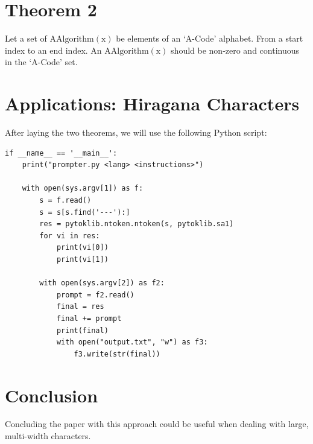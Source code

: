 \documentclass[10pt, twocolumn]{article}
\theoremstyle{plain}
\theoremstyle{definition}
\theoremstyle{remark}
\begin{document}
\section{Theorem 2}
\label{sec:acode-theorem02}

Let a set of $\operatorname{AAlgorithm(x)}$ be elements of an `A-Code' alphabet. From a start index to an end index. An $\operatorname{AAlgorithm(x)}$ should be non-zero and continuous in the `A-Code' set. 

\section{Applications: Hiragana Characters}
\label{sec:acode-conclusion}

After laying the two theorems, we will use the following Python script:

\begin{lstlisting}
if __name__ == '__main__':
    print("prompter.py <lang> <instructions>")
    
    with open(sys.argv[1]) as f: 
        s = f.read()
        s = s[s.find('---'):]
        res = pytoklib.ntoken.ntoken(s, pytoklib.sa1)
        for vi in res:
            print(vi[0])
            print(vi[1])
        
        with open(sys.argv[2]) as f2:
            prompt = f2.read()
            final = res
            final += prompt
            print(final)
            with open("output.txt", "w") as f3:
                f3.write(str(final))
\end{lstlisting}

\section{Conclusion}
\label{sec:acode-conclusion}

Concluding the paper with this approach could be useful when dealing with large, multi-width characters.
\end{document}
